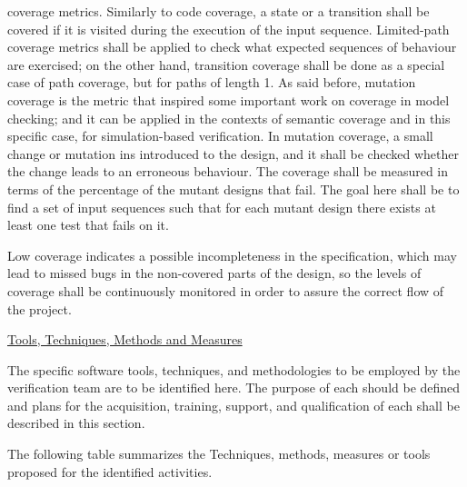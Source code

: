 \begin{itemize}
\begin{itemize}
  coverage metrics. Similarly to code coverage, a state or a
  transition shall be covered if it is visited during the execution of
  the input sequence. Limited-path coverage metrics shall be applied
  to check what expected sequences of behaviour are exercised; on the
  other hand, transition coverage shall be done as a special case of
  path coverage, but for paths of length 1. As said before, mutation
  coverage is the metric that inspired some important work on coverage
  in model checking; and it can be applied in the contexts of semantic
  coverage and in this specific case, for simulation-based
  verification. In mutation coverage, a small change or mutation ins
  introduced to the design, and it shall be checked whether the change
  leads to an erroneous behaviour.  The coverage shall be measured in
  terms of the percentage of the mutant designs that fail.  The goal
  here shall be to find a set of input sequences such that for each
  mutant design there exists at least one test that fails on it.
\end{itemize}
\end{itemize}

Low coverage indicates a possible incompleteness in the specification,
which may lead to missed bugs in the non-covered parts of the design,
so the levels of coverage shall be continuously monitored in order to
assure the correct flow of the project.

\underline{Tools, Techniques, Methods and Measures} 

The specific software tools, techniques, and methodologies to be
employed by the verification team are to be identified here. 
The purpose of each should be defined and plans for the acquisition,
training, support, and qualification of each shall be described in
this section. 

The following table summarizes the Techniques, methods, measures or
tools proposed for the identified activities.

